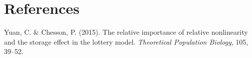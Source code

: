 \documentclass[11pt,]{article}
\begin{document}
\section*{References}\label{references}

\hypertarget{refs}{}
\hypertarget{ref-Yuan2015}{}
Yuan, C. \& Chesson, P. (2015). The relative importance of relative
nonlinearity and the storage effect in the lottery model.
\emph{Theoretical Population Biology}, 105, 39--52.
\end{document}
